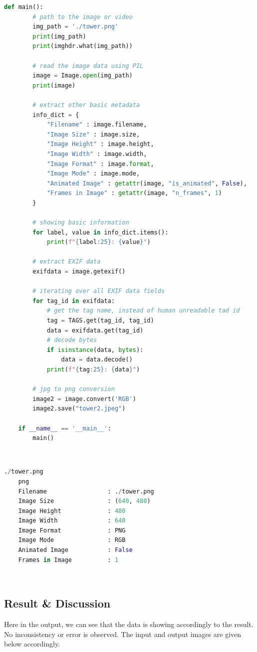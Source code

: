 \documentclass{article}
\begin{document}
{\begin{lstlisting}[language=Python, caption=Code for PNG to JPEG Image Conversion]
    def main():
        # path to the image or video
        img_path = './tower.png'
        print(img_path)
        print(imghdr.what(img_path))
    
        # read the image data using PIL
        image = Image.open(img_path)
        print(image)
    
        # extract other basic metadata
        info_dict = {
            "Filename" : image.filename,
            "Image Size" : image.size,
            "Image Height" : image.height,
            "Image Width" : image.width,
            "Image Format" : image.format,
            "Image Mode" : image.mode,
            "Animated Image" : getattr(image, "is_animated", False),
            "Frames in Image" : getattr(image, "n_frames", 1)
        }
    
        # showing basic information
        for label, value in info_dict.items():
            print(f"{label:25}: {value}")
        
        # extract EXIF data
        exifdata = image.getexif()
    
        # iterating over all EXIF data fields
        for tag_id in exifdata:
            # get the tag name, instead of human unreadable tad id
            tag = TAGS.get(tag_id, tag_id)
            data = exifdata.get(tag_id)
            # decode bytes
            if isinstance(data, bytes):
                data = data.decode()
            print(f"{tag:25}: {data}")
        
        # jpg to png conversion
        image2 = image.convert('RGB')
        image2.save("tower2.jpeg")
    
    if __name__ == '__main__':
        main()

    \end{lstlisting}
    \\
    \lstset{style=mystyle}
    \begin{lstlisting}[language=Python, caption=Output of PNG to JPEG Image Conversion]
    ./tower.png
    png
    Filename                 : ./tower.png
    Image Size               : (640, 480)
    Image Height             : 480
    Image Width              : 640
    Image Format             : PNG
    Image Mode               : RGB
    Animated Image           : False
    Frames in Image          : 1
    \end{lstlisting}
    \\
    \subsection{Result & Discussion}
    Here in the output, we can see that the data is showing accordingly to the result. No inconsistency or error is observed. The input and output images are given below accordingly.

}
\end{document}
